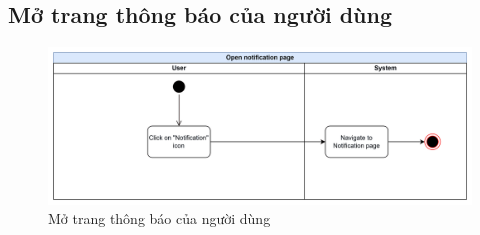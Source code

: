 \subsection{Mở trang thông báo của người dùng}
    \begin{figure}[H]
        \centering
        \includegraphics[width=\linewidth]{Content/Phân tích và thiết kế hệ thống/documents/Sơ đồ hoạt động/images/openNotificationPage.png}
        \vspace{0.5cm}
        \caption{Mở trang thông báo của người dùng}
        \label{fig:Mở trang thông báo của người dùng}
    \end{figure}